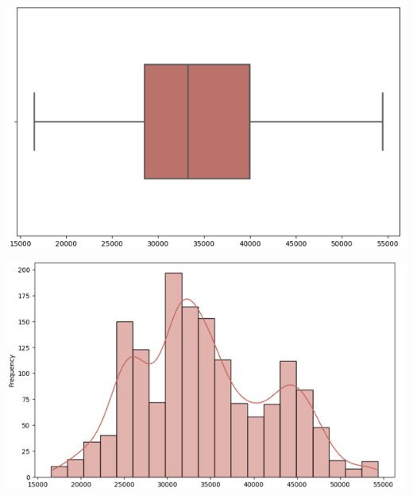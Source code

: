 \documentclass[conference]{IEEEtran}
\begin{document}
\begin{minipage}{0.23\textwidth}
    \centering
    \includegraphics[width=\linewidth]{images/bidv_boxplot.png}
    \label{fig:image1}
\end{minipage}
\hfill
\begin{minipage}{0.23\textwidth}
    \centering
    \includegraphics[width=\linewidth]{images/bidv_histogram.png}
    \label{fig:image2}
\end{minipage}
\end{document}
